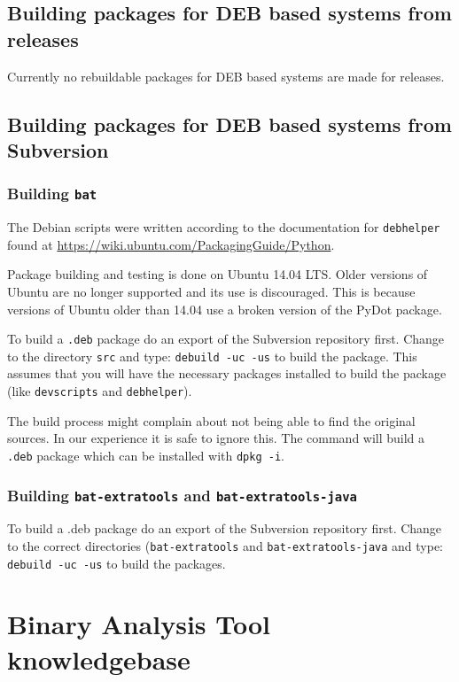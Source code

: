 \documentclass[10pt]{article}
\begin{document}
\subsection{Building packages for DEB based systems from releases}

Currently no rebuildable packages for DEB based systems are made for releases.

\subsection{Building packages for DEB based systems from Subversion}

\subsubsection{Building \texttt{bat}}

The Debian scripts were written according to the documentation for
\texttt{debhelper} found at \url{https://wiki.ubuntu.com/PackagingGuide/Python}.

Package building and testing is done on Ubuntu 14.04 LTS. Older versions of
Ubuntu are no longer supported and its use is discouraged. This is because
versions of Ubuntu older than 14.04 use a broken version of the PyDot package.

To build a \texttt{.deb} package do an export of the Subversion repository
first.  Change to the directory \texttt{src} and type:
\texttt{debuild -uc -us} to build the package. This assumes that you will have
the necessary packages installed to build the package (like \texttt{devscripts}
and \texttt{debhelper}).

The build process might complain about not being able to find the original
sources. In our experience it is safe to ignore this. The command will build a
\texttt{.deb} package which can be installed with \texttt{dpkg -i}.

\subsubsection{Building \texttt{bat-extratools} and
\texttt{bat-extratools-java}}

To build a .deb package do an export of the Subversion repository first. Change
to the correct directories (\texttt{bat-extratools} and 
\texttt{bat-extratools-java} and type: \texttt{debuild -uc -us} to
build the packages.

\section{Binary Analysis Tool knowledgebase}
\end{document}
